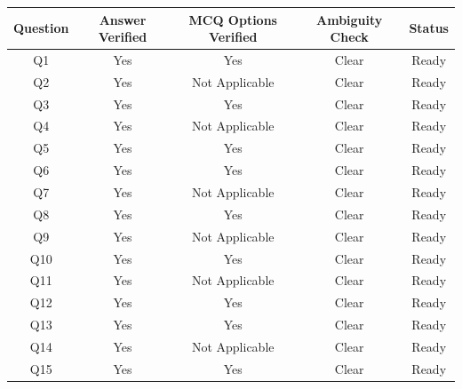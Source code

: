 \documentclass[11pt]{article}
\begin{document}
\begin{longtable}{|c|c|c|c|c|}
\hline
\textbf{Question} & \textbf{Answer Verified} & \textbf{MCQ Options Verified} & \textbf{Ambiguity Check} & \textbf{Status} \\
\hline
Q1 & Yes & Yes & Clear & Ready \\
\hline
Q2 & Yes & Not Applicable & Clear & Ready \\
\hline
Q3 & Yes & Yes & Clear & Ready \\
\hline
Q4 & Yes & Not Applicable & Clear & Ready \\
\hline
Q5 & Yes & Yes & Clear & Ready \\
\hline
Q6 & Yes & Yes & Clear & Ready \\
\hline
Q7 & Yes & Not Applicable & Clear & Ready \\
\hline
Q8 & Yes & Yes & Clear & Ready \\
\hline
Q9 & Yes & Not Applicable & Clear & Ready \\
\hline
Q10 & Yes & Yes & Clear & Ready \\
\hline
Q11 & Yes & Not Applicable & Clear & Ready \\
\hline
Q12 & Yes & Yes & Clear & Ready \\
\hline
Q13 & Yes & Yes & Clear & Ready \\
\hline
Q14 & Yes & Not Applicable & Clear & Ready \\
\hline
Q15 & Yes & Yes & Clear & Ready \\
\hline
\end{longtable}
\end{document}
